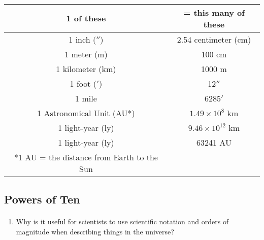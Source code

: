 \documentclass[12pt]{article}
\begin{document}
\begin{flushleft}
\paragraph{}
\begin{tabular}{cc}
\hline
\hline
{\bf1 of these} & {\bf= this many of these} \\
\hline
1 inch ($''$) & 2.54 centimeter (cm) \\
1 meter (m) & 100 cm \\
1 kilometer (km) & 1000 m \\
1 foot ($'$) & 12$''$ \\
1 mile & 6285$'$ \\
1 Astronomical Unit (AU*) & $1.49\times10^8$ km \\
1 light-year (ly) & $9.46\times10^{12}$ km \\
1 light-year (ly) & 63241 AU \\
\hline
\hline
*1 AU = the distance from Earth to the Sun
\end{tabular}

\subsection{Powers of Ten}
\paragraph{}
\begin{enumerate} 
\item Why is it useful for scientists to use scientific notation and orders of magnitude when describing things in the universe?
\end{enumerate}





\end{flushleft}
\end{document}
